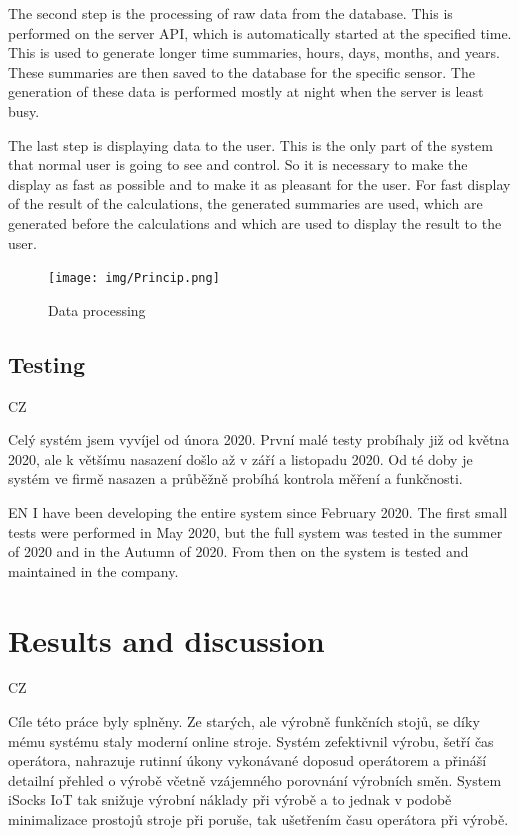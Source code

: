\documentclass[12pt, a4paper]{article}
\begin{document}
The second step is the processing of raw data from the database.
This is performed on the server API, which is automatically started at the specified time.
This is used to generate longer time summaries, hours, days, months, and years.
These summaries are then saved to the database for the specific sensor.
The generation of these data is performed mostly at night when the server is least busy.

The last step is displaying data to the user.
This is the only part of the system that normal user is going to see and control.
So it is necessary to make the display as fast as possible and to make it as pleasant for the user.
For fast display of the result of the calculations, the generated summaries are used, which are generated before the calculations and which are used to display the result to the user.


\begin{figure}[t]
    \centering
    \texttt{[image: img/Princip.png]}
    \caption{Data processing}
    \label{fig:princip}
\end{figure}


\subsection*{Testing}

CZ

Celý systém jsem vyvíjel od února 2020.
První malé testy probíhaly již od května 2020, ale k většímu nasazení došlo až v září a listopadu 2020.
Od té doby je systém ve firmě nasazen a průběžně probíhá kontrola měření a funkčnosti.

EN
I have been developing the entire system since February 2020.
The first small tests were performed in May 2020, but the full system was tested in the summer of 2020 and in the Autumn of 2020.
From then on the system is tested and maintained in the company.


\newpage
\section*{Results and discussion}

CZ

Cíle této práce byly splněny. Ze starých, ale výrobně funkčních stojů, se díky mému systému staly moderní online stroje.
Systém zefektivnil výrobu, šetří čas operátora, nahrazuje rutinní úkony vykonávané doposud operátorem a přináší detailní přehled o výrobě včetně vzájemného porovnání výrobních směn.
System iSocks IoT tak snižuje výrobní náklady při výrobě a to jednak v podobě minimalizace prostojů stroje při poruše, tak ušetřením času operátora při výrobě.
\end{document}

